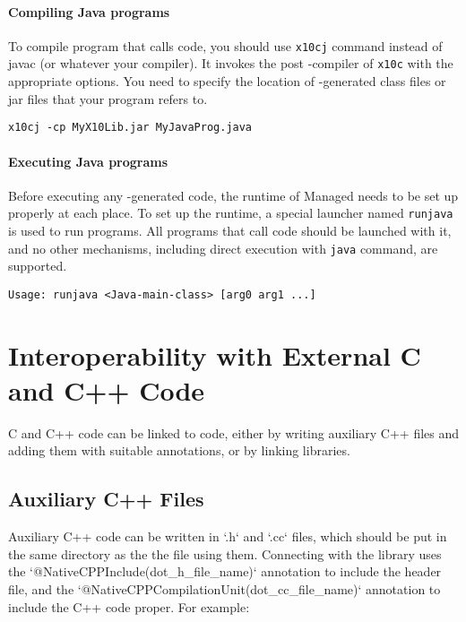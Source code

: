 \paragraph{Compiling Java programs}

To compile \Java{} program that calls \Xten{} code, you should use
\verb|x10cj| command instead of javac (or whatever your \Java{}
compiler). It invokes the post \Java{}-compiler of \verb|x10c| with the
appropriate options. You need to specify the location of \Xten{}-generated
class files or jar files that your \Java{} program refers to.

\verb|x10cj -cp MyX10Lib.jar MyJavaProg.java|


\paragraph{Executing Java programs}

Before executing any \Xten{}-generated \Java{} code, the runtime of Managed
\Xten{} needs to be set up properly at each place.  To set up the runtime,
a special launcher named \verb|runjava| is used to run \Java{} programs.
All \Java{} programs that call \Xten{} code should be launched with it, and
no other mechanisms, including direct execution with \verb|java| command, are
supported.

\begin{verbatim}
Usage: runjava <Java-main-class> [arg0 arg1 ...]
\end{verbatim}


\section{Interoperability with External C and C++ Code}

C and C++ code can be linked to \Xten{} code, either by writing auxiliary C++ files and
adding them with suitable annotations, or by linking libraries.

\subsection{Auxiliary C++ Files}

Auxiliary C++ code can be written in \xcd`.h` and \xcd`.cc` files, which
should be put in the same directory as the the \Xten{} file using them.
Connecting with the library uses the \xcd`@NativeCPPInclude(dot_h_file_name)`
annotation to include the header file, and the 
\xcd`@NativeCPPCompilationUnit(dot_cc_file_name)` annotation to include the
C++ code proper.  For example: 

